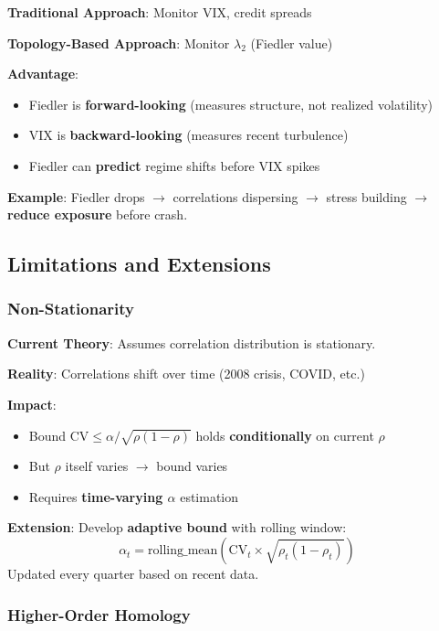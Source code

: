 \textbf{Traditional Approach}: Monitor VIX, credit spreads

\textbf{Topology-Based Approach}: Monitor $\lambda_2$ (Fiedler value)

\textbf{Advantage}:
\begin{itemize}
\item Fiedler is \textbf{forward-looking} (measures structure, not realized volatility)
\item VIX is \textbf{backward-looking} (measures recent turbulence)
\item Fiedler can \textbf{predict} regime shifts before VIX spikes
\end{itemize}

\textbf{Example}: Fiedler drops $\rightarrow$ correlations dispersing $\rightarrow$ stress building $\rightarrow$ \textbf{reduce exposure} before crash.

\subsection{Limitations and Extensions}

\subsubsection{Non-Stationarity}

\textbf{Current Theory}: Assumes correlation distribution is stationary.

\textbf{Reality}: Correlations shift over time (2008 crisis, COVID, etc.)

\textbf{Impact}:
\begin{itemize}
\item Bound $\text{CV} \leq \alpha/\sqrt{\rho(1-\rho)}$ holds \textbf{conditionally} on current $\rho$
\item But $\rho$ itself varies $\rightarrow$ bound varies
\item Requires \textbf{time-varying $\alpha$} estimation
\end{itemize}

\textbf{Extension}: Develop \textbf{adaptive bound} with rolling window:
\begin{equation}
\alpha_t = \text{rolling\_mean}(\text{CV}_t \times \sqrt{\rho_t(1-\rho_t)})
\end{equation}
Updated every quarter based on recent data.

\subsubsection{Higher-Order Homology}

